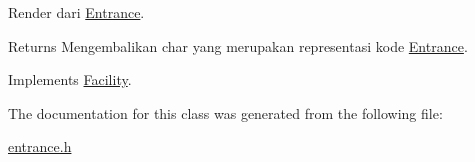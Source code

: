 Render dari \hyperlink{classEntrance}{Entrance}. 

\begin{DoxyReturn}{Returns}
Mengembalikan char yang merupakan representasi kode \hyperlink{classEntrance}{Entrance}. 
\end{DoxyReturn}


Implements \hyperlink{classFacility_a177b3f9cd142fe4521c1d15b00d3675c}{Facility}.



The documentation for this class was generated from the following file\+:\begin{DoxyCompactItemize}
\item 
\hyperlink{entrance_8h}{entrance.\+h}\end{DoxyCompactItemize}
